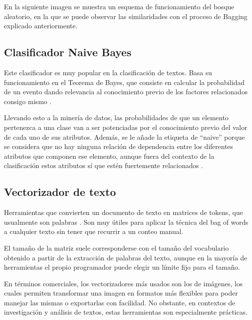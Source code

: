 En la siguiente imagen se muestra un esquema de funcionamiento del bosque aleatorio, en la que se puede observar las similaridades con el proceso de Bagging explicado anteriormente.


\subsection{Clasificador Naive Bayes}

Este clasificador es muy popular en la clasificación de textos. Basa su funcionamiento en el Teorema de Bayes, que consiste en calcular la probabilidad de un evento dando relevancia al conocimiento previo de los factores relacionados consigo mismo \cite{bayestheorem}.

Llevando esto a la minería de datos, las probabilidades de que un elemento pertenezca a una clase van a ser potenciadas por el conocimiento previo del valor de cada uno de sus atributos. Además, se le añade la etiqueta de ``naive'' porque se considera que no hay ninguna relación de dependencia entre los diferentes atributos que componen ese elemento, aunque fuera del contexto de la clasificación estos atributos sí que estén fuertemente relacionados \cite{bayesclassifier}.

\subsection{Vectorizador de texto}

Herramientas que convierten un documento de texto en matrices de tokens, que usualmente son palabras  \cite{countvectorizer}.
Son muy útiles para aplicar la técnica del bag of words a cualquier texto sin tener que recurrir a un conteo manual.

El tamaño de la matriz suele corresponderse con el tamaño del vocabulario obtenido a partir de la extracción de palabras del texto, aunque en la mayoría de herramientas el propio programador puede elegir un límite fijo para el tamaño. 

En términos comerciales, los vectorizadores más usados son los de imágenes, los cuales permiten transformar una imagen en formatos más flexibles para poder manejar las mismas o exportarlas con facilidad. No obstante, en contextos de investigación y análisis de textos, estas herramientas son especialmente prácticas.



